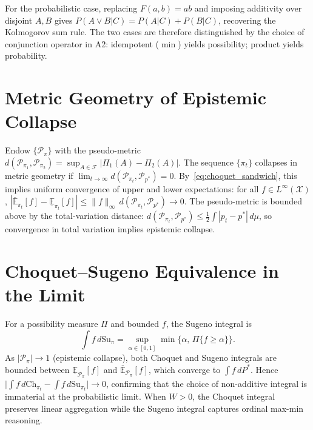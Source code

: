 \documentclass[12pt]{article}
\newcommand{\Ppi}{\mathcal{P}_\pi}
\newcommand{\calF}{\mathcal{F}}
\newcommand{\calX}{\mathcal{X}}
\newcommand{\E}{\mathbb{E}}
\newcommand{\Linfty}{L^\infty}
\begin{document}
For the probabilistic case, replacing $F(a,b)=ab$ and imposing additivity
over disjoint $A,B$ gives $P(A\vee B|C)=P(A|C)+P(B|C)$,
recovering the Kolmogorov sum rule.
The two cases are therefore distinguished by the choice of conjunction
operator in A2: idempotent ($\min$) yields possibility; product yields
probability.

\section{Metric Geometry of Epistemic Collapse}
\label{app:metric}

Endow $\{\Ppi\}$ with the pseudo-metric
$d(\mathcal{P}_{\pi_1},\mathcal{P}_{\pi_2})=\sup_{A\in\calF}|\Pi_1(A)-\Pi_2(A)|$.
The sequence $\{\pi_t\}$ collapses in metric geometry if
$\lim_{t\to\infty}d(\mathcal{P}_{\pi_t},\mathcal{P}_{p^*})=0$.
By~\eqref{eq:choquet_sandwich}, this implies uniform convergence of upper and
lower expectations: for all $f\in\Linfty(\calX)$,
$|\overline{\E}_{\pi_t}[f]-\underline{\E}_{\pi_t}[f]|\le\|f\|_\infty\,d(\mathcal{P}_{\pi_t},\mathcal{P}_{p^*})\to 0$.
The pseudo-metric is bounded above by the total-variation distance:
$d(\mathcal{P}_{\pi_t},\mathcal{P}_{p^*})\le\frac{1}{2}\int|p_t-p^*|\,d\mu$,
so convergence in total variation implies epistemic collapse.

\section{Choquet--Sugeno Equivalence in the Limit}
\label{app:sugeno}

For a possibility measure $\Pi$ and bounded $f$, the Sugeno integral is
\[
\int f\,d\mathrm{Su}_\pi = \sup_{\alpha\in[0,1]}\min\{\alpha,\,\Pi\{f\ge\alpha\}\}.
\]
As $|\Ppi|\to 1$ (epistemic collapse), both Choquet and Sugeno integrals
are bounded between $\underline{\E}_{\Ppi}[f]$ and $\overline{\E}_{\Ppi}[f]$,
which converge to $\int f\,dP^*$.
Hence $\bigl|\int f\,d\mathrm{Ch}_{\pi_t}-\int f\,d\mathrm{Su}_{\pi_t}\bigr|\to 0$,
confirming that the choice of non-additive integral is immaterial at the
probabilistic limit.
When $W>0$, the Choquet integral preserves linear aggregation while the
Sugeno integral captures ordinal max-min reasoning.

\end{document}
